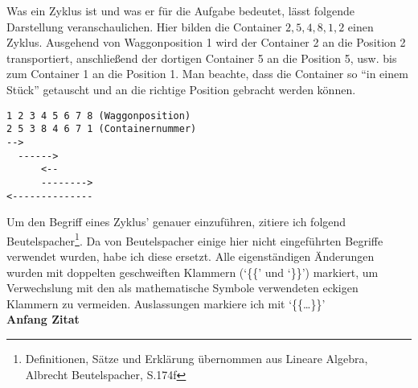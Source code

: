 Was ein Zyklus ist und was er für die Aufgabe bedeutet, lässt folgende Darstellung veranschaulichen.
Hier bilden die Container $2,5,4,8,1,2$ einen Zyklus. Ausgehend von Waggonposition 1 wird der Container 2 an die Position 2 transportiert,
anschließend der dortigen Container 5 an die Position 5, usw. bis zum Container 1 an die Position 1.
Man beachte, dass die Container so ``in einem Stück'' getauscht und an die richtige Position gebracht werden können.
\lstset{basicstyle=\ttfamily}
\begin{lstlisting}
1 2 3 4 5 6 7 8 (Waggonposition)
2 5 3 8 4 6 7 1 (Containernummer)
-->
  ------>
      <--
      -------->
<--------------
\end{lstlisting}
\lstset{basicstyle=\ttfamily}
Um den Begriff eines Zyklus' genauer einzuführen, zitiere ich folgend Beutelspacher\footnote{Definitionen, Sätze und Erklärung übernommen aus Lineare Algebra, Albrecht Beutelspacher, S.174f}.
Da von Beutelspacher einige hier nicht eingeführten Begriffe verwendet wurden, habe ich diese ersetzt.
Alle eigenständigen Änderungen wurden mit doppelten geschweiften Klammern (`\{\{' und `\}\}') markiert, um Verwechslung mit den als mathematische Symbole verwendeten eckigen Klammern zu vermeiden.
Auslassungen markiere ich mit `\{\{\dots\}\}'
\vspace{1em}  \\
\textbf{Anfang Zitat}
